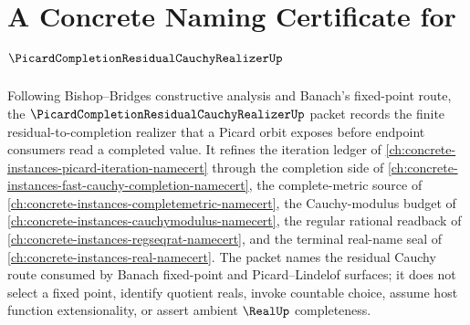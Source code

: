 \chapter{A Concrete Naming Certificate for $\PicardCompletionResidualCauchyRealizerUp$}
\label{ch:concrete-instances-picard-completion-residual-cauchy-realizer-namecert}

Following Bishop--Bridges constructive analysis and Banach's fixed-point route, the $\PicardCompletionResidualCauchyRealizerUp$ packet records the finite residual-to-completion realizer that a Picard orbit exposes before endpoint consumers read a completed value. It refines the iteration ledger of \autoref{ch:concrete-instances-picard-iteration-namecert} through the completion side of \autoref{ch:concrete-instances-fast-cauchy-completion-namecert}, the complete-metric source of \autoref{ch:concrete-instances-completemetric-namecert}, the Cauchy-modulus budget of \autoref{ch:concrete-instances-cauchymodulus-namecert}, the regular rational readback of \autoref{ch:concrete-instances-regseqrat-namecert}, and the terminal real-name seal of \autoref{ch:concrete-instances-real-namecert}. The packet names the residual Cauchy route consumed by Banach fixed-point and Picard--Lindelof surfaces; it does not select a fixed point, identify quotient reals, invoke countable choice, assume host function extensionality, or assert ambient $\RealUp$ completeness.

